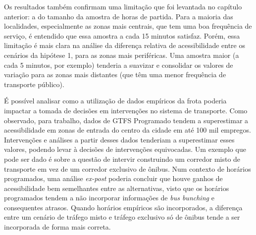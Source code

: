 \documentclass[        
    a4paper,          %
    12pt,             %
    chapter=TITLE,    %
    section=Title,    %
    subsection=Title, %
    oneside,          %
    english,          %
    spanish,          %
    brazil,           %
    fleqn             %
]{abntex2}
\begin{document}
  \begin{figure}[!h]
  \captionsetup{width=16cm}
  \centering
  \end{figure}
  
  Os resultados também confirmam uma limitação que foi levantada no capítulo anterior: a do tamanho da amostra de horas de partida. Para a maioria das localidades, especialmente as zonas mais centrais, que tem uma boa frequência de serviço, é entendido que essa amostra a cada 15 minutos satisfaz. Porém, essa limitação é mais clara na análise da diferença relativa de acessibilidade entre os cenários da hipótese 1, para as zonas mais periféricas. Uma amostra maior (a cada 5 minutos, por exemplo) tenderia a suavizar e consolidar os valores de variação para as zonas mais distantes (que têm uma menor frequência de transporte público).
  
  É possível analisar como a utilização de dados empíricos da frota poderia impactar a tomada de decisões em intervenções no sistema de transporte. Como observado, para trabalho, dados de GTFS Programado tendem a superestimar a acessibilidade em zonas de entrada do centro da cidade em até 100 mil empregos. Intervenções e análises a partir desses dados tenderiam a superestimar esses valores, podendo levar à decisões de intervenções equivocadas. Um exemplo que pode ser dado é sobre a questão de intervir construindo um corredor misto de transporte em vez de um corredor exclusivo de ônibus. Num contexto de horários programados, uma análise \emph{ex-post} poderia concluir que houve ganhos de acessibilidade bem semelhantes entre as alternativas, visto que os horários programados tendem a não incorporar informações de \emph{bus bunching} e consequentes atrasos. Quando horários empíricos são incorporados, a diferença entre um cenário de tráfego misto e tráfego exclusivo só de ônibus tende a ser incorporada de forma mais correta.
  
\end{document}
